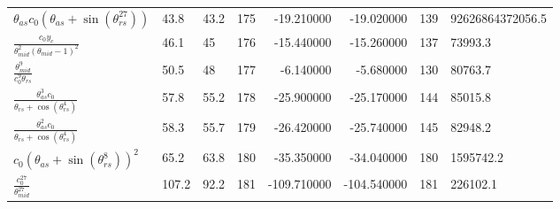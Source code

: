 \begin{tabularx}{\textwidth}{lllrrrrl}
$ \theta_{as} c_{0} \left(\theta_{as} + \sin{\left(\theta_{rs}^{27} \right)}\right) $  &  43.8  &  43.2  &  175  &  -19.210000  &  -19.020000  &  139  &  92626864372056.5  \\ 
$ \displaystyle\frac{c_{0} y_c}{\theta_{mid}^{2} \left(\theta_{mid} - 1\right)^{2}} $  &  46.1  &  45\phantom{.0}  &  176  &  -15.440000  &  -15.260000  &  137  &  73993.3  \\ 
$ \displaystyle\frac{\theta_{mid}^{9}}{c_{0}^{9} \theta_{rs}} $  &  50.5  &  48\phantom{.0}  &  177  &  -6.140000  &  -5.680000  &  130  &  80763.7  \\ 
$ \displaystyle\frac{\theta_{as}^{3} c_{0}}{\theta_{rs} + \cos{\left(\theta_{rs}^{4} \right)}} $  &  57.8  &  55.2  &  178  &  -25.900000  &  -25.170000  &  144  &  85015.8  \\ 
$ \displaystyle\frac{\theta_{as}^{2} c_{0}}{\theta_{rs} + \cos{\left(\theta_{rs}^{4} \right)}} $  &  58.3  &  55.7  &  179  &  -26.420000  &  -25.740000  &  145  &  82948.2  \\ 
$ c_{0} \left(\theta_{as} + \sin{\left(\theta_{rs}^{8} \right)}\right)^{2} $  &  65.2  &  63.8  &  180  &  -35.350000  &  -34.040000  &  180  &  1595742.2  \\ 
$ \displaystyle\frac{c_{0}^{27}}{\theta_{mid}^{27}} $  &  107.2  &  92.2  &  181  &  -109.710000  &  -104.540000  &  181  &  226102.1  \\ 
\bottomrule
\end{tabularx}
